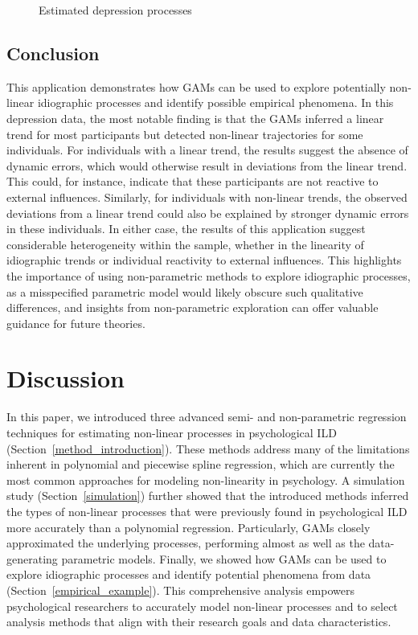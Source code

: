 \documentclass[man, floatsintext]{apa7}
\begin{document}
\begin{figure}[!t]
  \caption{Estimated depression processes}
  \label{fig:dem_smooth}
\end{figure}

\subsection{Conclusion}

This application demonstrates how GAMs can be used to explore potentially
non-linear idiographic processes and identify possible empirical phenomena. In
this depression data, the most notable finding is that the GAMs inferred a
linear trend for most participants but detected non-linear trajectories for
some individuals. For individuals with a linear trend, the results suggest the
absence of dynamic errors, which would otherwise result in deviations from the
linear trend. This could, for instance, indicate that these participants are
not reactive to external influences. Similarly, for individuals with non-linear
trends, the observed deviations from a linear trend could also be explained by
stronger dynamic errors in these individuals. In either case, the results of
this application suggest considerable heterogeneity within the sample, whether
in the linearity of idiographic trends or individual reactivity to external
influences. This highlights the importance of using non-parametric methods to
explore idiographic processes, as a misspecified parametric model would likely
obscure such qualitative differences, and insights from non-parametric
exploration can offer valuable guidance for future theories.

\section{Discussion}

In this paper, we introduced three advanced semi- and non-parametric regression
techniques for estimating non-linear processes in psychological ILD
(Section~\ref{method_introduction}). These methods address many of the
limitations inherent in polynomial and piecewise spline regression, which are
currently the most common approaches for modeling non-linearity in psychology.
A simulation study (Section~\ref{simulation}) further showed that the
introduced methods inferred the types of non-linear processes that were
previously found in psychological ILD more accurately than a polynomial
regression. Particularly, GAMs closely approximated the underlying processes,
performing almost as well as the data-generating parametric models. Finally, we
showed how GAMs can be used to explore idiographic processes and identify
potential phenomena from data (Section~\ref{empirical_example}). This
comprehensive analysis empowers psychological researchers to accurately model
non-linear processes and to select analysis methods that align with their
research goals and data characteristics.
\end{document}
